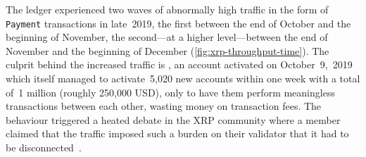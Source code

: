 The ledger experienced two waves of abnormally high traffic in the form of \texttt{Payment} transactions in late~2019, the first between the end of October and the beginning of November, the second---at a higher level---between the end of November and the beginning of December (\autoref{fig:xrp-throughput-time}).
The culprit behind the increased traffic is , an account activated on October~9,~2019 which itself managed to activate~5,020 new accounts within one week with a total of~1 million  (roughly 250,000 USD), only to have them perform meaningless transactions between each other, wasting money on transaction fees.
The behaviour triggered a heated debate in the XRP community where a member claimed that the traffic imposed such a burden on their validator that it had to be disconnected~\cite{Tulo2019}.




